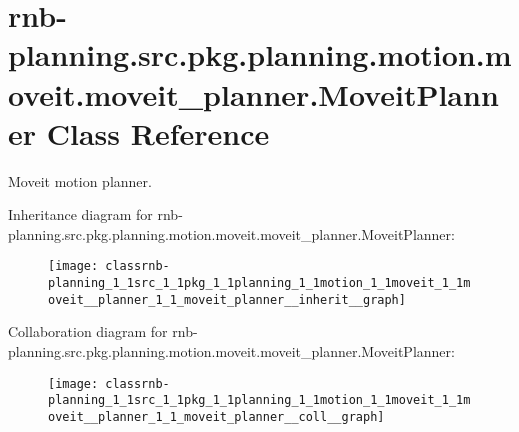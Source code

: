 \hypertarget{classrnb-planning_1_1src_1_1pkg_1_1planning_1_1motion_1_1moveit_1_1moveit__planner_1_1_moveit_planner}{}\section{rnb-\/planning.src.\+pkg.\+planning.\+motion.\+moveit.\+moveit\+\_\+planner.\+Moveit\+Planner Class Reference}
\label{classrnb-planning_1_1src_1_1pkg_1_1planning_1_1motion_1_1moveit_1_1moveit__planner_1_1_moveit_planner}


Moveit motion planner.  




Inheritance diagram for rnb-\/planning.src.\+pkg.\+planning.\+motion.\+moveit.\+moveit\+\_\+planner.\+Moveit\+Planner\+:
\nopagebreak
\begin{figure}[H]
\begin{center}
\leavevmode
\texttt{[image: classrnb-planning\_1\_1src\_1\_1pkg\_1\_1planning\_1\_1motion\_1\_1moveit\_1\_1moveit\_\_planner\_1\_1\_moveit\_planner\_\_inherit\_\_graph]}
\end{center}
\end{figure}


Collaboration diagram for rnb-\/planning.src.\+pkg.\+planning.\+motion.\+moveit.\+moveit\+\_\+planner.\+Moveit\+Planner\+:
\nopagebreak
\begin{figure}[H]
\begin{center}
\leavevmode
\texttt{[image: classrnb-planning\_1\_1src\_1\_1pkg\_1\_1planning\_1\_1motion\_1\_1moveit\_1\_1moveit\_\_planner\_1\_1\_moveit\_planner\_\_coll\_\_graph]}
\end{center}
\end{figure}
